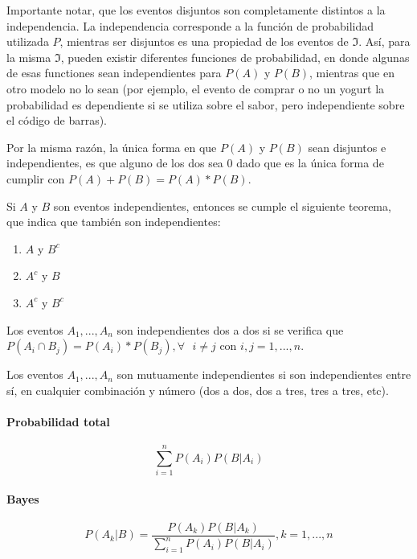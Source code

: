 \documentclass[]{article}
\providecommand{\tightlist}{%
  \setlength{\itemsep}{0pt}\setlength{\parskip}{0pt}}
\let\oldparagraph\paragraph
\renewcommand{\paragraph}[1]{\oldparagraph{#1}\mbox{}}
\begin{document}
Importante notar, que los eventos disjuntos son completamente distintos
a la independencia. La independencia corresponde a la función de
probabilidad utilizada \(P\), mientras ser disjuntos es una propiedad de
los eventos de \(\Im\). Así, para la misma \(\Im\), pueden existir
diferentes funciones de probabilidad, en donde algunas de esas
functiones sean independientes para \(P(A)\) y \(P(B)\), mientras que en
otro modelo no lo sean (por ejemplo, el evento de comprar o no un yogurt
la probabilidad es dependiente si se utiliza sobre el sabor, pero
independiente sobre el código de barras).

Por la misma razón, la única forma en que \(P(A)\) y \(P(B)\) sean
disjuntos e independientes, es que alguno de los dos sea 0 dado que es
la única forma de cumplir con \(P(A) + P(B) = P(A) * P(B)\).

Si \(A\) y \(B\) son eventos independientes, entonces se cumple el
siguiente teorema, que indica que también son independientes:

\begin{enumerate}
\def\labelenumi{\arabic{enumi}.}
\tightlist
\item
  \(A\) y \(B^c\)
\item
  \(A^c\) y \(B\)
\item
  \(A^c\) y \(B^c\)
\end{enumerate}

Los eventos \(A_1, ..., A_n\) son independientes dos a dos si se
verifica que
\(P(A_i \cap B_j) = P(A_i) * P(B_j), \forall \text{ } i \neq j\) con
\(i,j = 1, ..., n\).

Los eventos \(A_1, ..., A_n\) son mutuamente independientes si son
independientes entre sí, en cualquier combinación y número (dos a dos,
dos a tres, tres a tres, etc).

\paragraph{Probabilidad total}\label{probabilidad-total}

\begin{equation}
\sum_{i=1}^nP(A_i)P(B|A_i)
\label{eq:probabilidad-total}
\end{equation}

\paragraph{Bayes}\label{bayes}

\begin{equation}
P(A_k|B) = \frac{P(A_k)P(B|A_k)}{\sum_{i=1}^nP(A_i)P(B|A_i)}, k=1,...,n
\label{eq:teorema-bayes}
\end{equation}
\end{document}
